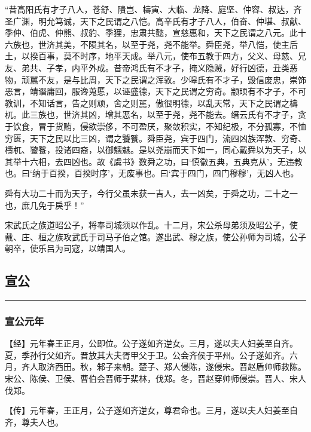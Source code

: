 \documentclass[]{article}
\begin{document}
``昔高阳氏有才子八人，苍舒、隤岂、檮寅、大临、龙降、庭坚、仲容、叔达，齐圣广渊，明允笃诚，天下之民谓之八恺。高辛氏有才子八人，伯奋、仲堪、叔献、季仲、伯虎、仲熊、叔豹、季狸，忠肃共懿，宣慈惠和，天下之民谓之八元。此十六族也，世济其美，不陨其名，以至于尧，尧不能举。舜臣尧，举八恺，使主后土，以揆百事，莫不时序，地平天成。举八元，使布五教于四方，父义、母慈、兄友、弟共、子孝，内平外成。昔帝鸿氏有不才子，掩义隐贼，好行凶德，丑类恶物，顽嚚不友，是与比周，天下之民谓之浑敦。少嗥氏有不才子，毁信废忠，崇饰恶言，靖谮庸回，服谗蒐慝，以诬盛德，天下之民谓之穷奇。颛顼有不才子，不可教训，不知话言，告之则顽，舍之则嚚，傲很明德，以乱天常，天下之民谓之檮杌。此三族也，世济其凶，增其恶名，以至于尧，尧不能去。缙云氏有不才子，贪于饮食，冒于货贿，侵欲崇侈，不可盈厌，聚敛积实，不知纪极，不分孤寡，不恤穷匮，天下之民以比三凶，谓之饕餮。舜臣尧，宾于四门，流四凶族浑敦、穷奇、檮杌、饕餮，投诸四裔，以御魑魅。是以尧崩而天下如一，同心戴舜以为天子，以其举十六相，去四凶也。故《虞书》数舜之功，曰`慎徽五典，五典克从'，无违教也。曰`纳于百揆，百揆时序'，无废事也。曰`宾于四门，四门穆穆'，无凶人也。

舜有大功二十而为天子，今行父虽未获一吉人，去一凶矣，于舜之功，二十之一也，庶几免于戾乎！''

宋武氏之族道昭公子，将奉司城须以作乱。十二月，宋公杀母弟须及昭公子，使戴、庄、桓之族攻武氏于司马子伯之馆。遂出武、穆之族，使公孙师为司城，公子朝卒，使乐吕为司寇，以靖国人。

\hypertarget{header-n1291}{%
\subsection{宣公}\label{header-n1291}}

\begin{center}\rule{0.5\linewidth}{\linethickness}\end{center}

\hypertarget{header-n1293}{%
\subsubsection{宣公元年}\label{header-n1293}}

【经】元年春王正月，公即位。公子遂如齐逆女。三月，遂以夫人妇姜至自齐。夏，季孙行父如齐。晋放其大夫胥甲父于卫。公会齐侯于平州。公子遂如齐。六月，齐人取济西田。秋，邾子来朝。楚子、郑人侵陈，遂侵宋。晋赵盾帅师救陈。宋公、陈侯、卫侯、曹伯会晋师于棐林，伐郑。冬，晋赵穿帅师侵崇。晋人、宋人伐郑。

【传】元年春，王正月，公子遂如齐逆女，尊君命也。三月，遂以夫人妇姜至自齐，尊夫人也。
\end{document}
